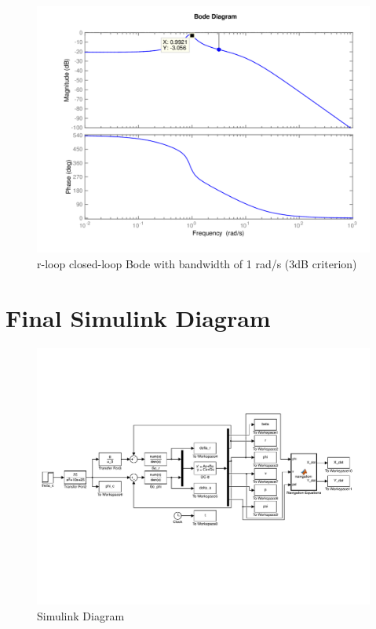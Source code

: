 \documentclass[12pt]{article}
\begin{document}
\begin{figure}[h!]
\begin{center}
\includegraphics[height=.375\textheight]{figures/r_delta_r_closed_loop}
\caption{r-loop closed-loop Bode with bandwidth of 1 rad/s (3dB criterion)}
\end{center}
\end{figure}

\clearpage
\section{Final Simulink Diagram}
\begin{figure}[h!]
\begin{center}
\includegraphics[width=1\textwidth]{figures/final_simulink}
\caption{Simulink Diagram}
\end{center}
\end{figure}
\end{document}
